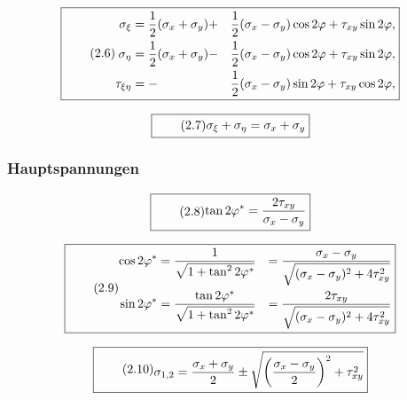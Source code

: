 \documentclass[11pt]{article}
\newcommand{\1}{ {\mathds{1}} }
\begin{document}
		\begin{equation}
			\boxed{
				\tag{2.6}
				\begin{split}
					\sigma_{\xi} &= \frac{1}{2} (\sigma_x + \sigma_y) +&\frac{1}{2}(\sigma_x - \sigma_y) \cos 2 \varphi + \tau_{xy} \sin 2 \varphi, \\
					\sigma_{\eta} &= \frac{1}{2} (\sigma_x + \sigma_y) -&\frac{1}{2}(\sigma_x - \sigma_y) \cos 2 \varphi + \tau_{xy} \sin 2 \varphi,\\
					\tau_{\xi \eta} &= -&\frac{1}{2}(\sigma_x - \sigma_y) \sin 2 \varphi + \tau_{xy} \cos 2 \varphi,
				\end{split}
			}
		\end{equation}
		
		\begin{equation}
			\boxed{
				\tag{2.7}
				\begin{split}
					\sigma_\xi + \sigma_\eta
					=
					\sigma_x + \sigma_y
				\end{split}
			}
		\end{equation}

		\subsubsection{Hauptspannungen}
		
		\begin{equation}
			\boxed{
				\tag{2.8}
				\begin{split}
					\tan 2\varphi^\ast
					=
					\frac{2 \tau_{xy}}{\sigma_x - \sigma_y}
				\end{split}
			}
		\end{equation}

		\begin{equation}
			\boxed{
				\tag{2.9}
				\begin{split}
					\cos 2\varphi^\ast
					&=
					\frac{1}{\sqrt{1+ \tan^2 2\varphi^\ast}}
					&=
					\frac{\sigma_x - \sigma_y}{\sqrt{(\sigma_x - \sigma_y)^2 + 4 \tau_{xy}^2}} \\
					\sin 2\varphi^\ast
					&=
					\frac{\tan 2\varphi^\ast}{\sqrt{1+ \tan^2 2\varphi^\ast}}
					&=
					\frac{2\tau_{xy}}{\sqrt{(\sigma_x - \sigma_y)^2 + 4 \tau_{xy}^2}} \\					
				\end{split}
			}
		\end{equation}

		\begin{equation}
			\boxed{
				\tag{2.10}
				\begin{split}
					\sigma_{1,2}
					=
					\frac{\sigma_x + \sigma_y}{2}
					\pm
					\sqrt{\left(
						\frac{\sigma_x - \sigma_y}{2}
						\right)^2
						+
						\tau_{xy}^2
					}
				\end{split}
			}
		\end{equation}
\end{document}
